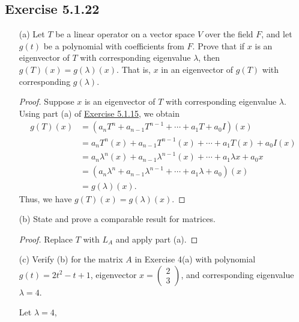 \subsection*{Exercise 5.1.22}
\begin{enumerate}
    \item[(a)] Let \( T  \) be a linear operator on a vector space \( V  \) over the field \( F  \), and let \( g(t) \) be a polynomial with coefficients from \( F  \). Prove that if \( x  \) is an eigenvector of \( T  \) with corresponding eigenvalue \( \lambda  \), then \( g(T)(x) = g(\lambda)(x) \). That is, \( x  \) in an eigenvector of \( g(T) \) with corresponding \( g(\lambda) \).
        \begin{proof}
        Suppose \( x  \) is an eigenvector of \( T  \) with corresponding eigenvalue \( \lambda  \). Using part (a) of {\hyperref[Exercise 5.1.15]{Exercise 5.1.15}}, we obtain 
        \begin{align*}
            g(T)(x) &= ({a}_{n} T^{n} + {a}_{n-1} T^{n-1} + \cdots + {a}_{1} T + {a}_{0} I )(x) \\
                    &= {a}_{n} T^{n}(x) + {a}_{n-1} T^{n-1}(x) + \cdots + {a}_{1} T(x) + {a}_{0} I(x) \\
                    &= {a}_{n} \lambda^{n}(x) + {a}_{n-1} \lambda^{n-1} (x) + \cdots + {a}_{1} \lambda x + {a}_{0} x \\
                    &=  ({a}_{n} \lambda^{n} + {a}_{n-1} \lambda^{n-1} + \cdots + {a}_{1} \lambda + {a}_{0})(x) \\
                    &= g(\lambda)(x).
        \end{align*}
        Thus, we have \( g(T)(x) = g(\lambda)(x) \).
        \end{proof}
    \item[(b)] State and prove a comparable result for matrices.
        \begin{proof}
        Replace \( T  \) with \( {L}_{A} \) and apply part (a).
        \end{proof}
    \item[(c)] Verify (b) for the matrix \( A  \) in Exercise 4(a) with polynomial \( g(t) = 2 t^{2} - t + 1  \), eigenvector \( x = \begin{pmatrix} 
               2 \\
               3
              \end{pmatrix}  \), and corresponding eigenvalue \( \lambda = 4  \).
              \begin{solution}
              Let \( \lambda = 4  \), 

\end{solution}
\end{enumerate}
